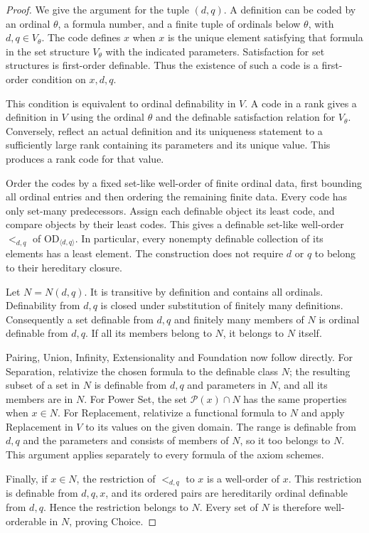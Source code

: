 \documentclass[11pt,letterpaper]{article}
\theoremstyle{definition}
\newcommand{\OD}{\mathrm{OD}}
\newcommand{\Pow}{\mathcal P}
\newcommand{\ODpar}[2]{\OD_{\langle #1,#2\rangle}}
\begin{document}
\begin{proof}
We give the argument for the tuple $(d,q)$. A definition can be coded by an ordinal $\theta$, a formula number, and a finite tuple of ordinals below $\theta$, with $d,q\in V_\theta$. The code defines $x$ when $x$ is the unique element satisfying that formula in the set structure $V_\theta$ with the indicated parameters. Satisfaction for set structures is first-order definable. Thus the existence of such a code is a first-order condition on $x,d,q$.

This condition is equivalent to ordinal definability in $V$. A code in a rank gives a definition in $V$ using the ordinal $\theta$ and the definable satisfaction relation for $V_\theta$. Conversely, reflect an actual definition and its uniqueness statement to a sufficiently large rank containing its parameters and its unique value. This produces a rank code for that value.

Order the codes by a fixed set-like well-order of finite ordinal data, first bounding all ordinal entries and then ordering the remaining finite data. Every code has only set-many predecessors. Assign each definable object its least code, and compare objects by their least codes. This gives a definable set-like well-order $<_{d,q}$ of $\ODpar dq$. In particular, every nonempty definable collection of its elements has a least element. The construction does not require $d$ or $q$ to belong to their hereditary closure.

Let $N=N(d,q)$. It is transitive by definition and contains all ordinals. Definability from $d,q$ is closed under substitution of finitely many definitions. Consequently a set definable from $d,q$ and finitely many members of $N$ is ordinal definable from $d,q$. If all its members belong to $N$, it belongs to $N$ itself.

Pairing, Union, Infinity, Extensionality and Foundation now follow directly. For Separation, relativize the chosen formula to the definable class $N$; the resulting subset of a set in $N$ is definable from $d,q$ and parameters in $N$, and all its members are in $N$. For Power Set, the set $\Pow(x)\cap N$ has the same properties when $x\in N$. For Replacement, relativize a functional formula to $N$ and apply Replacement in $V$ to its values on the given domain. The range is definable from $d,q$ and the parameters and consists of members of $N$, so it too belongs to $N$. This argument applies separately to every formula of the axiom schemes.

Finally, if $x\in N$, the restriction of $<_{d,q}$ to $x$ is a well-order of $x$. This restriction is definable from $d,q,x$, and its ordered pairs are hereditarily ordinal definable from $d,q$. Hence the restriction belongs to $N$. Every set of $N$ is therefore well-orderable in $N$, proving Choice.
\end{proof}
\end{document}

